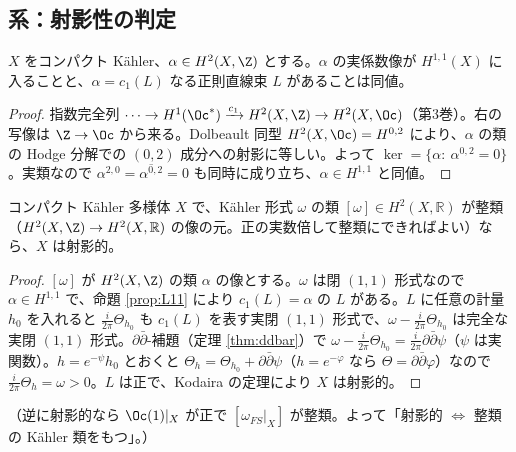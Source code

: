 \subsection{系：射影性の判定}
\begin{prop}\label{prop:L11}\tP
$X$ をコンパクト Kähler、$\alpha\in H^2(X,\Z)$ とする。$\alpha$ の実係数像が $H^{1,1}(X)$ に入ることと、$\alpha=c_1(L)$ なる正則直線束 $L$ があることは同値。
\end{prop}
\begin{proof}
指数完全列 $\cdots\to H^1(\Oc^*)\xrightarrow{c_1}H^2(X,\Z)\to H^2(X,\Oc)$（第3巻）。右の写像は $\Z\to\Oc$ から来る。Dolbeault 同型 $H^2(X,\Oc)=H^{0,2}$ により、$\alpha$ の類の Hodge 分解での $(0,2)$ 成分への射影に等しい。よって $\ker=\{\alpha:\ \alpha^{0,2}=0\}$。実類なので $\alpha^{2,0}=\overline{\alpha^{0,2}}=0$ も同時に成り立ち、$\alpha\in H^{1,1}$ と同値。
\end{proof}
\begin{thm}\label{thm:hodgemfd}\tP
コンパクト Kähler 多様体 $X$ で、Kähler 形式 $\omega$ の類 $[\omega]\in H^2(X,\mathbb R)$ が整類（$H^2(X,\Z)\to H^2(X,\mathbb R)$ の像の元。正の実数倍して整類にできればよい）なら、$X$ は射影的。
\end{thm}
\begin{proof}
$[\omega]$ が $H^2(X,\Z)$ の類 $\alpha$ の像とする。$\omega$ は閉 $(1,1)$ 形式なので $\alpha\in H^{1,1}$ で、命題 \ref{prop:L11} により $c_1(L)=\alpha$ の $L$ がある。$L$ に任意の計量 $h_0$ を入れると $\frac i{2\pi}\Theta_{h_0}$ も $c_1(L)$ を表す実閉 $(1,1)$ 形式で、$\omega-\frac i{2\pi}\Theta_{h_0}$ は完全な実閉 $(1,1)$ 形式。$\partial\bar\partial$-補題（定理 \ref{thm:ddbar}）で $\omega-\frac i{2\pi}\Theta_{h_0}=\frac i{2\pi}\partial\bar\partial\psi$（$\psi$ は実関数）。$h=e^{-\psi}h_0$ とおくと $\Theta_h=\Theta_{h_0}+\partial\bar\partial\psi$（$h=e^{-\varphi}$ なら $\Theta=\partial\bar\partial\varphi$）なので $\frac i{2\pi}\Theta_h=\omega>0$。$L$ は正で、Kodaira の定理により $X$ は射影的。
\end{proof}
（逆に射影的なら $\Oc(1)|_X$ が正で $[\omega_{FS}|_X]$ が整類。よって「射影的 $\iff$ 整類の Kähler 類をもつ」。）

